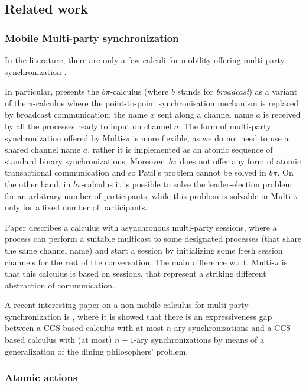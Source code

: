 \documentclass[submission,copyright,creativecommons]{eptcs}
\begin{document}
\subsection{Related work}


\subsubsection{Mobile Multi-party synchronization}
 
In the literature, there are only a few calculi for mobility offering multi-party synchronization  \cite{EM99,HYC08}. 

In particular,  \cite{EM99} presents the $b\pi$-calculus (where $b$ stands for {\em broadcast}) as  a variant of the 
$\pi$-calculus where the point-to-point synchronisation mechanism is replaced by broadcast communication: the
name $x$ sent along a channel name $a$ is received by all the processes ready to input on channel $a$.
The form of multi-party synchronization offered by Multi-$\pi$ is more flexible, as we do not need to use
a shared channel name $a$, rather it is implemented as an atomic sequence of standard binary synchronizations.
Moreover, $b\pi$ does not offer any form of atomic transactional communication and so Patil's problem
cannot be solved in  $b\pi$. On the other hand, in $b\pi$-calculus it is possible to solve the leader-election problem
for an arbitrary number of participants, while this problem is solvable in Multi-$\pi$ only for a fixed number of participants.

Paper \cite{HYC08} describes a calculus with asynchronous multi-party sessions, where a process can perform a suitable multicast
to some designated processes (that share the same channel name) and start a session by initializing some fresh session channels 
for the rest of the conversation. The main difference w.r.t. Multi-$\pi$ is that this calculus is based on sessions, that represent
a striking different abstraction of communication.

A recent interesting paper on a non-mobile calculus for multi-party synchronization is \cite{LV10}, where
it is showed that there is an expressiveness gap between a CCS-based calculus with at most $n$-ary synchronizations
and a CCS-based calculus with (at most) $n+1$-ary synchronizations 
by means of a generalization of the dining philosophers' problem.

\subsubsection{Atomic actions}
\end{document}

